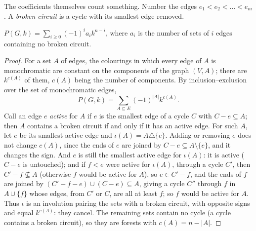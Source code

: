 The coefficients themselves count something. Number the edges $e_1<e_2<\dots<e_m$. A \emph{broken circuit} is a cycle with its smallest edge removed.

\begin{theorem}[Whitney, 1932]\label{thm:whitney}
$P(G,k)=\sum_{i\ge0}(-1)^ia_ik^{n-i}$, where $a_i$ is the number of sets of $i$ edges containing no broken circuit.
\end{theorem}
\begin{proof}
For a set $A$ of edges, the colourings in which every edge of $A$ is monochromatic are constant on the components of the graph $(V,A)$; there are $k^{c(A)}$ of them,
$c(A)$ being the number of components. By inclusion--exclusion over the set of monochromatic edges,
\[
P(G,k)=\sum_{A\subseteq E}(-1)^{|A|}k^{c(A)}.
\]
Call an edge $e$ \emph{active} for $A$ if $e$ is the smallest edge of a cycle $C$ with $C-e\subseteq A$; then $A$ contains a broken circuit if and only if it has an active edge. For such $A$, let
$e$ be its smallest active edge and $\iota(A)=A\triangle\{e\}$. Adding or removing $e$ does not change $c(A)$, since the ends of $e$ are joined by $C-e\subseteq A\setminus\{e\}$, and it
changes the sign. And $e$ is still the smallest active edge for $\iota(A)$: it is active ($C-e$ is untouched); and if $f<e$ were active for $\iota(A)$, through a cycle $C'$, then $C'-f\not\subseteq A$
(otherwise $f$ would be active for $A$), so $e\in C'-f$, and the ends of $f$ are joined by $(C'-f-e)\cup(C-e)\subseteq A$, giving a cycle $C''$ through $f$ in $A\cup\{f\}$ whose edges, from $C'$ or $C$, are all
at least $f$; so $f$ would be active for $A$. Thus $\iota$ is an involution pairing the sets with a broken circuit, with opposite signs and equal $k^{c(A)}$: they cancel. The
remaining sets contain no cycle (a cycle contains a broken circuit), so they are forests with $c(A)=n-|A|$.
\end{proof}

